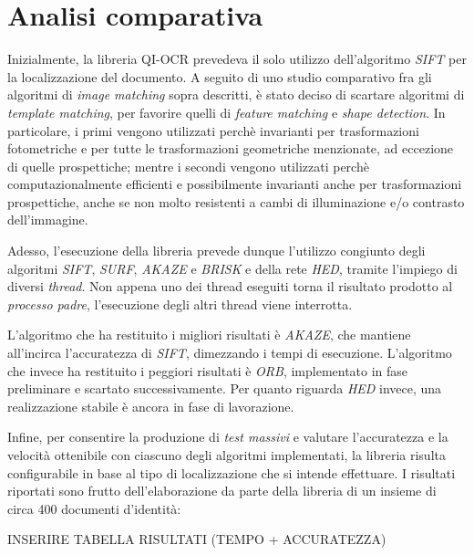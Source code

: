\section{Analisi comparativa}
\label{sec:image-matching-comparison}
Inizialmente, la libreria QI-OCR prevedeva il solo utilizzo dell'algoritmo \textit{SIFT} per la localizzazione del documento. A seguito di uno studio comparativo fra gli algoritmi di \textit{image matching} sopra descritti, \`e stato deciso di scartare algoritmi di \textit{template matching}, per favorire quelli di \textit{feature matching} e \textit{shape detection}. In particolare, i primi vengono utilizzati perch\`e invarianti per trasformazioni fotometriche e per tutte le trasformazioni geometriche menzionate, ad eccezione di quelle prospettiche; mentre i secondi vengono utilizzati perch\`e computazionalmente efficienti e possibilmente invarianti anche per trasformazioni prospettiche, anche se non molto resistenti a cambi di illuminazione e/o contrasto dell'immagine.\par
Adesso, l'esecuzione della libreria prevede dunque l'utilizzo congiunto degli algoritmi \textit{SIFT}, \textit{SURF}, \textit{AKAZE} e \textit{BRISK} e della rete \textit{HED}, tramite l'impiego di diversi \textit{thread}. Non appena uno dei thread eseguiti torna il risultato prodotto al \textit{processo padre}, l'esecuzione degli altri thread viene interrotta.\par
L'algoritmo che ha restituito i migliori risultati \`e \textit{AKAZE}, che mantiene all'incirca l'accuratezza di \textit{SIFT}, dimezzando i tempi di esecuzione. L'algoritmo che invece ha restituito i peggiori risultati \`e \textit{ORB}, implementato in fase preliminare e scartato successivamente. Per quanto riguarda \textit{HED} invece, una realizzazione stabile \`e ancora in fase di lavorazione.\par
Infine, per consentire la produzione di \textit{test massivi} e valutare l'accuratezza e la velocit\`a ottenibile con ciascuno degli algoritmi implementati, la libreria risulta configurabile in base al tipo di localizzazione che si intende effettuare. I risultati riportati sono frutto dell'elaborazione da parte della libreria di un insieme di circa 400 documenti d'identit\`a: 

INSERIRE TABELLA RISULTATI (TEMPO +  ACCURATEZZA)
